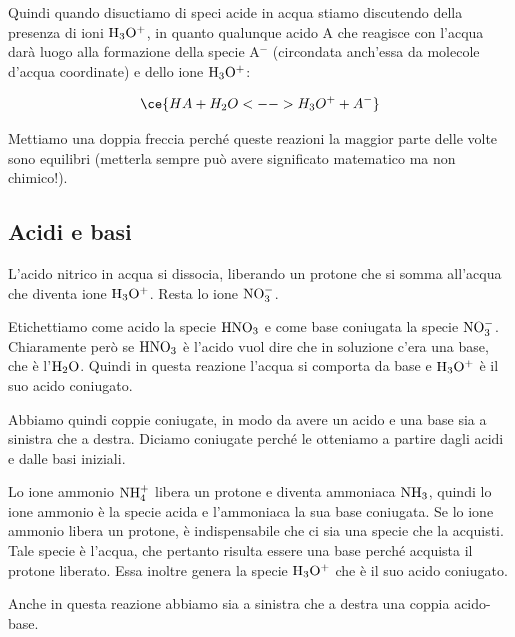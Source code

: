 \vspace{0.2cm}Quindi quando disuctiamo di speci acide in acqua stiamo discutendo della presenza di ioni $\rm H_3O^+$, in quanto qualunque acido A che reagisce con l'acqua darà luogo alla formazione della specie A$^-$ (circondata anch'essa da molecole d'acqua coordinate) e dello ione $\rm H_3O^+$:

$$\ce{HA + H_2O <--> H_3O^+ + A^-}$$

Mettiamo una doppia freccia perché queste reazioni la maggior parte delle volte sono equilibri (metterla sempre può avere significato matematico ma non chimico!).
\subsection{Acidi e basi}

\vspace{0.2cm}

\vspace{0.2cm}L'acido nitrico in acqua si dissocia, liberando un protone che si somma all'acqua che diventa ione $\rm H_3O^+$. Resta lo ione $\rm NO_3^-$.

Etichettiamo come acido la specie $\rm HNO_3$ e come base coniugata la specie $\rm NO_3^-$. Chiaramente però se $\rm HNO_3$ è l'acido vuol dire che in soluzione c'era una base, che è l'$\rm H_2O$. Quindi in questa reazione l'acqua si comporta da base e $\rm H_3O^+$ è il suo acido coniugato.

Abbiamo quindi coppie coniugate, in modo da avere un acido e una base sia a sinistra che a destra. Diciamo coniugate perché le otteniamo a partire dagli acidi e dalle basi iniziali.

\vspace{0.2cm}

\vspace{0.2cm}Lo ione ammonio $\rm NH_4^+$ libera un protone e diventa ammoniaca $\rm NH_3$, quindi lo ione ammonio è la specie acida e l'ammoniaca la sua base coniugata. Se lo ione ammonio libera un protone, è indispensabile che ci sia una specie che la acquisti. Tale specie è l'acqua, che pertanto risulta essere una base perché acquista il protone liberato. Essa inoltre genera la specie $\rm H_3O^+$ che è il suo acido coniugato.

Anche in questa reazione abbiamo sia a sinistra che a destra una coppia acido-base.

\vspace{0.2cm}

